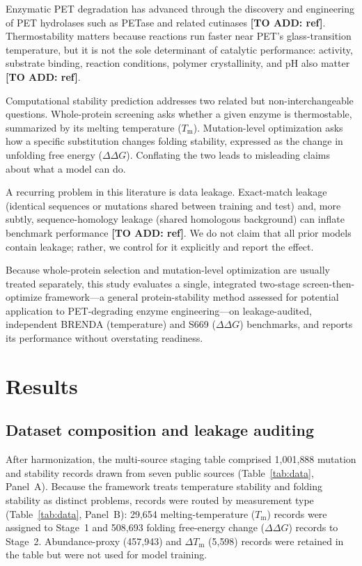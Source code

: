 \documentclass[11pt]{article}
\newcommand{\filler}[1]{\colorbox{filleryellow}{\bfseries [TO ADD: #1]}}
\newcommand{\ddg}{\ensuremath{\Delta\Delta G}}
\newcommand{\Tm}{\ensuremath{T_\mathrm{m}}}
\newcommand{\dtm}{\ensuremath{\Delta T_\mathrm{m}}}
\begin{document}
Enzymatic PET degradation has advanced through the discovery and engineering of PET hydrolases
such as PETase and related cutinases \filler{ref}. Thermostability matters because reactions run
faster near PET's glass-transition temperature, but it is not the sole determinant of catalytic
performance: activity, substrate binding, reaction conditions, polymer crystallinity, and pH
also matter \filler{ref}.

Computational stability prediction addresses two related but non-interchangeable questions.
Whole-protein screening asks whether a given enzyme is thermostable, summarized by its melting
temperature (\Tm). Mutation-level optimization asks how a specific substitution changes folding
stability, expressed as the change in unfolding free energy (\ddg). Conflating the two leads to
misleading claims about what a model can do.

A recurring problem in this literature is data leakage. Exact-match leakage (identical sequences
or mutations shared between training and test) and, more subtly, sequence-homology leakage
(shared homologous background) can inflate benchmark performance \filler{ref}. We do not claim
that all prior models contain leakage; rather, we control for it explicitly and report the
effect.

Because whole-protein selection and mutation-level optimization are usually treated separately,
this study evaluates a single, integrated two-stage screen-then-optimize framework---a general
protein-stability method assessed for potential application to PET-degrading enzyme
engineering---on leakage-audited, independent BRENDA (temperature) and S669 (\ddg) benchmarks,
and reports its performance without overstating readiness.

\section{Results}

\subsection{Dataset composition and leakage auditing}
After harmonization, the multi-source staging table comprised 1{,}001{,}888 mutation and
stability records drawn from seven public sources (Table~\ref{tab:data}, Panel~A). Because the
framework treats temperature stability and folding stability as distinct problems, records were
routed by measurement type (Table~\ref{tab:data}, Panel~B): 29{,}654 melting-temperature (\Tm)
records were assigned to Stage~1 and 508{,}693 folding free-energy change (\ddg) records to
Stage~2. Abundance-proxy (457{,}943) and \dtm{} (5{,}598) records were retained in the table but
were not used for model training.
\end{document}

